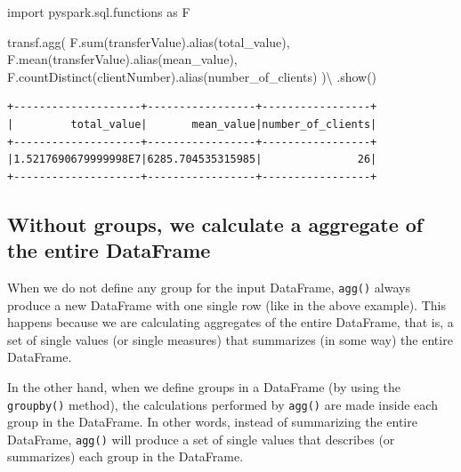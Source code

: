 \documentclass[
  11pt,
  letterpaper,
  DIV=11,
  numbers=noendperiod]{scrreprt}
\newenvironment{Shaded}{\begin{snugshade}}{\end{snugshade}}
\newcommand{\BuiltInTok}[1]{\textcolor[rgb]{0.00,0.23,0.31}{#1}}
\newcommand{\ImportTok}[1]{\textcolor[rgb]{0.00,0.46,0.62}{#1}}
\newcommand{\NormalTok}[1]{\textcolor[rgb]{0.00,0.23,0.31}{#1}}
\newcommand{\OperatorTok}[1]{\textcolor[rgb]{0.37,0.37,0.37}{#1}}
\newcommand{\StringTok}[1]{\textcolor[rgb]{0.13,0.47,0.30}{#1}}
\begin{document}
\begin{Shaded}
\begin{Highlighting}[]
\ImportTok{import}\NormalTok{ pyspark.sql.functions }\ImportTok{as}\NormalTok{ F}

\NormalTok{transf.agg(}
\NormalTok{    F.}\BuiltInTok{sum}\NormalTok{(}\StringTok{\textquotesingle{}transferValue\textquotesingle{}}\NormalTok{).alias(}\StringTok{\textquotesingle{}total\_value\textquotesingle{}}\NormalTok{),}
\NormalTok{    F.mean(}\StringTok{\textquotesingle{}transferValue\textquotesingle{}}\NormalTok{).alias(}\StringTok{\textquotesingle{}mean\_value\textquotesingle{}}\NormalTok{),}
\NormalTok{    F.countDistinct(}\StringTok{\textquotesingle{}clientNumber\textquotesingle{}}\NormalTok{).alias(}\StringTok{\textquotesingle{}number\_of\_clients\textquotesingle{}}\NormalTok{)}
\NormalTok{  )}\OperatorTok{\textbackslash{}}
\NormalTok{  .show()}
\end{Highlighting}
\end{Shaded}

\begin{verbatim}
+--------------------+-----------------+-----------------+
|         total_value|       mean_value|number_of_clients|
+--------------------+-----------------+-----------------+
|1.5217690679999998E7|6285.704535315985|               26|
+--------------------+-----------------+-----------------+
\end{verbatim}

\hypertarget{without-groups-we-calculate-a-aggregate-of-the-entire-dataframe}{%
\subsection{Without groups, we calculate a aggregate of the entire
DataFrame}\label{without-groups-we-calculate-a-aggregate-of-the-entire-dataframe}}

When we do not define any group for the input DataFrame, \texttt{agg()}
always produce a new DataFrame with one single row (like in the above
example). This happens because we are calculating aggregates of the
entire DataFrame, that is, a set of single values (or single measures)
that summarizes (in some way) the entire DataFrame.

In the other hand, when we define groups in a DataFrame (by using the
\texttt{groupby()} method), the calculations performed by \texttt{agg()}
are made inside each group in the DataFrame. In other words, instead of
summarizing the entire DataFrame, \texttt{agg()} will produce a set of
single values that describes (or summarizes) each group in the
DataFrame.
\end{document}
